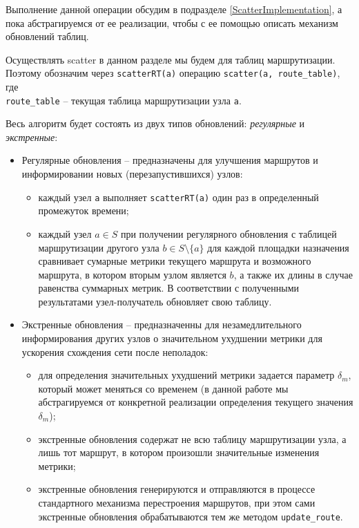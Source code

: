 \documentclass{article}
\theoremstyle{plain}
\theoremstyle{plain}
\theoremstyle{plain}
\theoremstyle{plain}
\theoremstyle{definition}
\theoremstyle{remark}
\theoremstyle{plain}
\begin{document}
Выполнение данной операции обсудим в подразделе \ref{ScatterImplementation}, а пока абстрагируемся от ее реализации, чтобы с ее помощью описать механизм обновлений таблиц.

Осуществлять scatter в данном разделе мы будем для таблиц маршрутизации. Поэтому обозначим через \texttt{scatterRT(a)} операцию \texttt{scatter(a, route\_table)}, где \\
\texttt{route\_table} -- текущая таблица маршрутизации узла \texttt{a}.

Весь алгоритм будет состоять из двух типов обновлений: \textit{регулярные} и \textit{экстренные}:

\begin{itemize}
    \item Регулярные обновления -- предназначены для улучшения маршрутов и информировании новых (перезапустившихся) узлов:
    
    \begin{itemize}
        \item каждый узел \texttt{a} выполняет \texttt{scatterRT(a)} один раз в определенный промежуток времени;
        
        \item каждый узел $a \in S$ при получении регулярного обновления с таблицей маршрутизации другого узла $b \in S \setminus \{a\}$ для каждой площадки назначения сравнивает сумарные метрики текущего маршрута и возможного маршрута, в котором вторым узлом является $b$, а также их длины в случае равенства суммарных метрик. В соответствии с полученными результатами узел-получатель обновляет свою таблицу.
    \end{itemize}
    
    \item Экстренные обновления -- предназначенны для незамедлительного информирования других узлов о значительном ухудшении метрики для ускорения схождения сети после неполадок:
    
    \begin{itemize}
        \item для определения значительных ухудшений метрики задается параметр $\delta_m$, который может меняться со временем (в данной работе мы абстрагируемся от конкретной реализации определения текущего значения $\delta_m$);
        
        \item экстренные обновления содержат не всю таблицу маршрутизации узла, а лишь тот маршрут, в котором произошли значительные изменения метрики;
        
        \item экстренные обновления генерируются и отправляются в процессе стандартного механизма перестроения маршрутов, при этом сами экстренные обновления обрабатываются тем же методом \texttt{update\_route}.
    \end{itemize}
\end{itemize}
\end{document}
